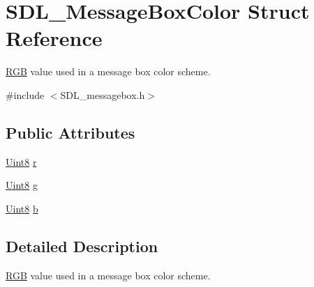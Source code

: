 \hypertarget{struct_s_d_l___message_box_color}{\section{S\-D\-L\-\_\-\-Message\-Box\-Color Struct Reference}
\label{struct_s_d_l___message_box_color}
}


\hyperlink{struct_r_g_b}{R\-G\-B} value used in a message box color scheme.  




{\ttfamily \#include $<$S\-D\-L\-\_\-messagebox.\-h$>$}

\subsection*{Public Attributes}
\begin{DoxyCompactItemize}
\item 
\hyperlink{_s_d_l__stdinc_8h_a2944638813a090aa23e62f4da842c3e2}{Uint8} \hyperlink{struct_s_d_l___message_box_color_a43ab2172c10058380fcf67ecc3f53184}{r}
\item 
\hyperlink{_s_d_l__stdinc_8h_a2944638813a090aa23e62f4da842c3e2}{Uint8} \hyperlink{struct_s_d_l___message_box_color_a5820adab0b32aa3eade101ea36ed6b4a}{g}
\item 
\hyperlink{_s_d_l__stdinc_8h_a2944638813a090aa23e62f4da842c3e2}{Uint8} \hyperlink{struct_s_d_l___message_box_color_ad1215a42167cb5b190ff8f19dbd42066}{b}
\end{DoxyCompactItemize}


\subsection{Detailed Description}
\hyperlink{struct_r_g_b}{R\-G\-B} value used in a message box color scheme. 

